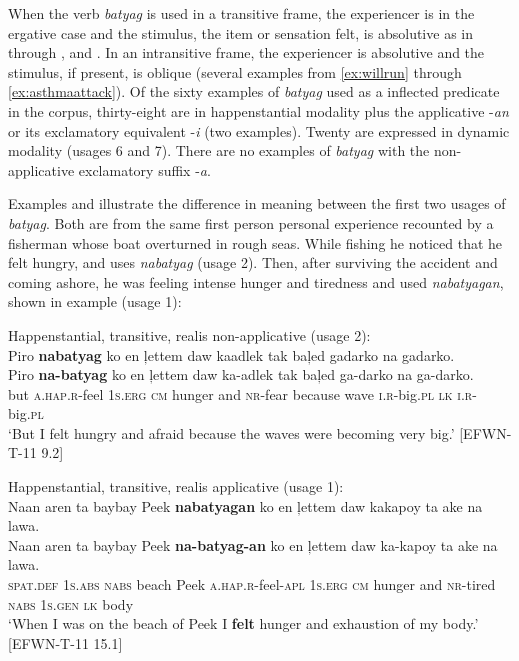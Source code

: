 When the verb \textit{batyag} is used in a transitive frame, the experiencer is in the ergative case and the stimulus, the item or sensation felt, is absolutive as in  through , and . In an intransitive frame, the experiencer is absolutive and the stimulus, if present, is oblique (several examples from \ref{ex:willrun} through \ref{ex:asthmaattack}). Of the sixty examples of \textit{batyag} used as a inflected predicate in the corpus, thirty-eight are in happenstantial modality plus the applicative \nobreakdash-\textit{an} or its exclamatory equivalent -\textit{i} (two examples). Twenty are expressed in dynamic modality (usages 6 and 7). There are no examples of \textit{batyag} with the non-applicative exclamatory suffix -\textit{a}.  

\newpage
Examples  and  illustrate the difference in meaning between the first two usages of \textit{batyag}. Both are from the same first person personal experience recounted by a fisherman whose boat overturned in rough seas. While fishing he noticed that he felt hungry, and uses \textit{nabatyag}  (usage 2). Then, after surviving the accident and coming ashore, he was feeling intense hunger and tiredness and used \textit{nabatyagan}, shown in example  (usage 1): 

\ea
\label{ex:becomingverybig}
Happenstantial, transitive, realis non-applicative (usage 2): \\
Piro \textbf{nabatyag} ko en ļettem daw kaadlek tak baļed gadarko na gadarko. \\\smallskip
\gll Piro \textbf{na-batyag} ko en ļettem daw ka-adlek tak baļed ga-darko na ga-darko. \\
but \textsc{a.hap.r}-feel 1\textsc{s.erg} \textsc{cm} hunger and \textsc{nr}-fear because wave \textsc{i.r}-big.\textsc{pl} \textsc{lk} \textsc{i.r}-big.\textsc{pl} \\
\glt ‘But I felt hungry and afraid because the waves were becoming very big.’ [EFWN-T-11 9.2]
\z

\ea
Happenstantial, transitive, realis applicative (usage 1): \\
\label{bkm:Ref122532854}
Naan  aren  ta  baybay  Peek  \textbf{nabatyagan}  ko  en ļettem  daw  kakapoy  ta  ake  na  lawa. \\\smallskip
\gll Naan  aren  ta  baybay  Peek  \textbf{na-batyag-an}  ko  en ļettem  daw  ka-kapoy  ta  ake  na  lawa. \\
\textsc{spat.def}  1\textsc{s.abs}  \textsc{nabs}  beach  Peek  \textsc{a.hap.r}-feel-\textsc{apl}  1\textsc{s.erg}  \textsc{cm}
hunger  and  \textsc{nr}-tired  \textsc{nabs}  1\textsc{s.gen}  \textsc{lk}  body \\
\glt `When I was on the beach of Peek I \textbf{felt} hunger and exhaustion of my body.’ [EFWN-T-11 15.1]
\z

